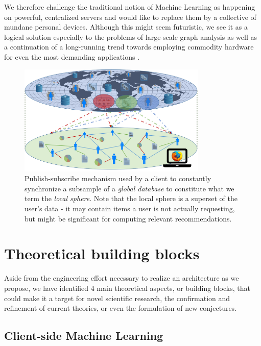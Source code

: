 \documentclass{llncs}
\begin{document}
We therefore challenge the traditional notion of Machine Learning as happening on powerful, centralized servers and would like to replace them by a collective of mundane personal devices. Although this might seem futuristic, we see it as a logical solution especially to the problems of large-scale graph analysis \cite{leskovec2006samplinggraphs} as well as a continuation of a long-running trend towards employing commodity hardware for even the most demanding applications \cite{al2008scalable}.


\begin{figure}[H]
	\begin{center}
		\includegraphics[width=0.8\textwidth]{figures/local_sphere}
		\caption{Publish-subscribe mechanism used by a client to constantly synchronize a subsample of a \textit{global database} to constitute what we term the \textit{local sphere}. Note that the local sphere is a superset of the user's data - it may contain items a user is not actually requesting, but might be significant for computing relevant recommendations.}
		\label{fig:local_sphere}
	\end{center}
\end{figure}



\section{Theoretical building blocks}
\label{sect:bg_related}

Aside from the engineering effort necessary to realize an architecture as we propose, we have identified 4 main theoretical aspects, or building blocks, that could make it a target for novel scientific research, the confirmation and refinement of current theories, or even the formulation of new conjectures.

\subsection{Client-side Machine Learning}
\label{ssect:cs_ML}
\end{document}
